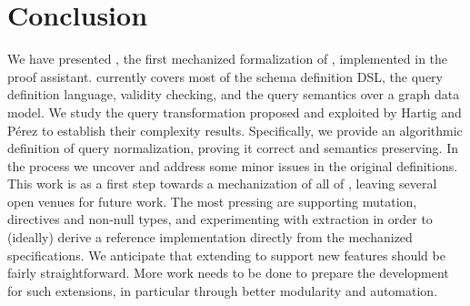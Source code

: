 \section{Conclusion}
\label{sec:conclusion}

We have presented \gcoql, the first mechanized formalization of \gql, 
implemented in the \coq proof assistant. 
\gcoql currently covers most of the schema definition DSL, the query definition language, validity checking, and the query semantics over a graph data model. We study the query transformation proposed and exploited by Hartig and P{\'e}rez to establish their complexity results. Specifically, we provide an algorithmic definition of query normalization, proving it correct and semantics preserving. In the process we uncover and address some minor issues in the original definitions.
%
This work is as a first step towards a mechanization of all of \gql, leaving several  open venues for future work. The most pressing are supporting mutation, directives and non-null types, and experimenting with extraction in order to (ideally) derive a reference implementation directly from the mechanized specifications. We anticipate that extending \gcoql to support new features should be fairly straightforward. More work needs to be done to prepare the \coq development for such extensions, in particular through better modularity and automation.
